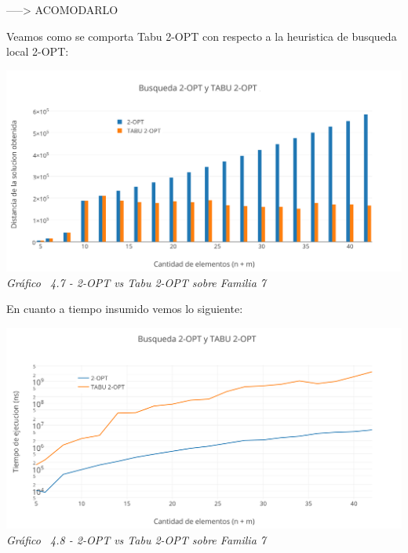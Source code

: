 -----> ACOMODARLO

Veamos como se comporta Tabu 2-OPT con respecto a la heuristica de busqueda local 2-OPT:

\vspace*{0.3cm} \vspace*{0.3cm}
  \begin{center}
 \includegraphics[scale=0.5]{./EJ4/comparativoanillos2opt.png}\\
 {            \textit{Gráfico \ 4.7 - 2-OPT vs Tabu 2-OPT sobre Familia 7}}
  \end{center}
  \vspace*{0.3cm}

En cuanto a tiempo insumido vemos lo siguiente:

\vspace*{0.3cm} \vspace*{0.3cm}
  \begin{center}
 \includegraphics[scale=0.5]{./EJ4/medicionanillos2opt.png}\\
 {            \textit{Gráfico \ 4.8 - 2-OPT vs Tabu 2-OPT sobre Familia 7}}
  \end{center}
  \vspace*{0.3cm}


